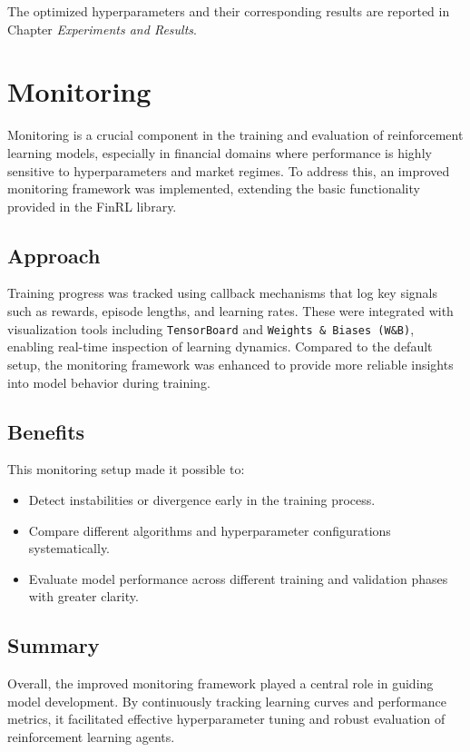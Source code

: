 \documentclass[12pt,a4paper]{report}
\begin{document}
The optimized hyperparameters and their corresponding results are reported in Chapter \textit{Experiments and Results}.

\section{Monitoring}
\label{sec:monitoring}

Monitoring is a crucial component in the training and evaluation of reinforcement learning models, especially in financial domains where performance is highly sensitive to hyperparameters and market regimes. To address this, an improved monitoring framework was implemented, extending the basic functionality provided in the FinRL library.

\subsection{Approach}
Training progress was tracked using callback mechanisms that log key signals such as rewards, episode lengths, and learning rates. These were integrated with visualization tools including \texttt{TensorBoard} and \texttt{Weights \& Biases (W\&B)}, enabling real-time inspection of learning dynamics. Compared to the default setup, the monitoring framework was enhanced to provide more reliable insights into model behavior during training.

\subsection{Benefits}
This monitoring setup made it possible to:
\begin{itemize}
    \item Detect instabilities or divergence early in the training process.
    \item Compare different algorithms and hyperparameter configurations systematically.
    \item Evaluate model performance across different training and validation phases with greater clarity.
\end{itemize}

\subsection{Summary}
Overall, the improved monitoring framework played a central role in guiding model development. By continuously tracking learning curves and performance metrics, it facilitated effective hyperparameter tuning and robust evaluation of reinforcement learning agents.
\end{document}
